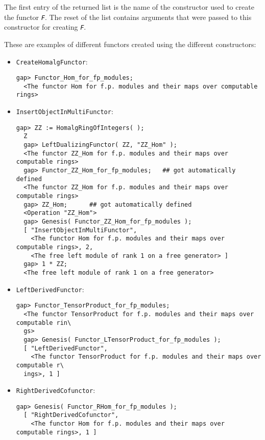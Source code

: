 \documentclass[a4paper,11pt]{report}
\begin{document}
{{{ The first entry of the returned list is the name of the constructor used to
create the functor \mbox{\texttt{\slshape F}}. The reset of the list contains arguments that were passed to this
constructor for creating \mbox{\texttt{\slshape F}}. 

 These are examples of different functors created using the different
constructors: 
\begin{itemize}
\item  \texttt{CreateHomalgFunctor}: 
\begin{Verbatim}[fontsize=\small,frame=single,label=Example]
  gap> Functor_Hom_for_fp_modules;
  <The functor Hom for f.p. modules and their maps over computable rings>
\end{Verbatim}

\item  \texttt{InsertObjectInMultiFunctor}: 
\begin{Verbatim}[fontsize=\small,frame=single,label=Example]
  gap> ZZ := HomalgRingOfIntegers( );
  Z
  gap> LeftDualizingFunctor( ZZ, "ZZ_Hom" );
  <The functor ZZ_Hom for f.p. modules and their maps over computable rings>
  gap> Functor_ZZ_Hom_for_fp_modules;	## got automatically defined
  <The functor ZZ_Hom for f.p. modules and their maps over computable rings>
  gap> ZZ_Hom;		## got automatically defined
  <Operation "ZZ_Hom">
  gap> Genesis( Functor_ZZ_Hom_for_fp_modules );
  [ "InsertObjectInMultiFunctor",
    <The functor Hom for f.p. modules and their maps over computable rings>, 2,
    <The free left module of rank 1 on a free generator> ]
  gap> 1 * ZZ;
  <The free left module of rank 1 on a free generator>
\end{Verbatim}

\item  \texttt{LeftDerivedFunctor}: 
\begin{Verbatim}[fontsize=\small,frame=single,label=Example]
  gap> Functor_TensorProduct_for_fp_modules;
  <The functor TensorProduct for f.p. modules and their maps over computable rin\
  gs>
  gap> Genesis( Functor_LTensorProduct_for_fp_modules );
  [ "LeftDerivedFunctor",
    <The functor TensorProduct for f.p. modules and their maps over computable r\
  ings>, 1 ]
\end{Verbatim}

\item  \texttt{RightDerivedCofunctor}: 
\begin{Verbatim}[fontsize=\small,frame=single,label=Example]
  gap> Genesis( Functor_RHom_for_fp_modules );
  [ "RightDerivedCofunctor",
    <The functor Hom for f.p. modules and their maps over computable rings>, 1 ]
\end{Verbatim}


\end{itemize}}}}
\end{document}
